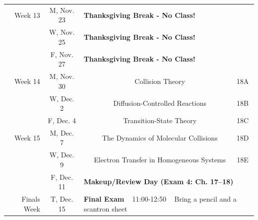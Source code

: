 \begin{tabular}{rcccc}
	\midrule
	Week 13     & M, Nov. 23 & \multicolumn{3}{l}{\textbf{Thanksgiving Break - No Class!}}                                                                                          \\
	            & W, Nov. 25 & \multicolumn{3}{l}{\textbf{Thanksgiving Break - No Class!}}                                                                                          \\
	            & F, Nov. 27 & \multicolumn{3}{l}{\textbf{Thanksgiving Break - No Class!}}                                                                                          \\
	\midrule
	Week 14     & M, Nov. 30 &                                                                                             & Collision Theory                             & 18A     \\
	            & W, Dec. 2  &                                                                                             & Diffusion-Controlled Reactions               & 18B     \\
	            & F, Dec. 4  &                                                                                             & Transition-State Theory                      & 18C     \\
	\midrule
	Week 15     & M, Dec. 7  &                                                                                             & The Dynamics of Molecular Collisions         & 18D     \\
	            & W, Dec. 9  &                                                                                             & Electron Transfer in Homogeneous Systems     & 18E     \\
	            & F, Dec. 11 & \multicolumn{3}{l}{\textbf{Makeup/Review Day (Exam 4: Ch. 17--18)}}                                                                                  \\
	\midrule
	\midrule
	Finals Week & T, Dec. 15 & \multicolumn{3}{l}{\textbf{Final Exam} ~ 11:00-12:50 ~ Bring a pencil and a scantron sheet}                                                          \\
\end{tabular}
